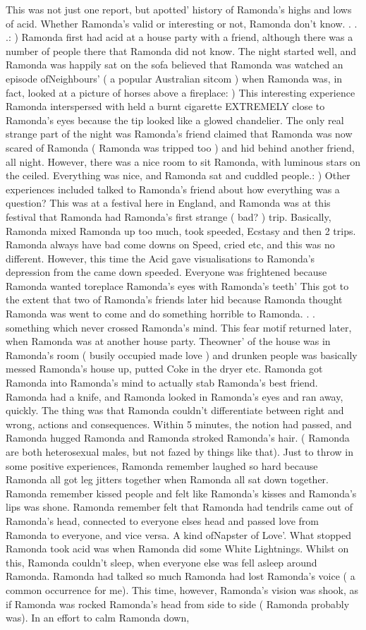 \documentclass[12pt]{book}
\begin{document}
This was not just one report, but apotted' history of Ramonda's highs and lows of acid. Whether Ramonda's valid or interesting or not, Ramonda don't know. . . .: ) Ramonda first had acid at a house party with a friend, although there was a number of people there that Ramonda did not know. The night started well, and Ramonda was happily sat on the sofa believed that Ramonda was watched an episode ofNeighbours' ( a popular Australian sitcom ) when Ramonda was, in fact, looked at a picture of horses above a fireplace: ) This interesting experience Ramonda interspersed with held a burnt cigarette EXTREMELY close to Ramonda's eyes because the tip looked like a glowed chandelier. The only real strange part of the night was Ramonda's friend claimed that Ramonda was now scared of Ramonda ( Ramonda was tripped too ) and hid behind another friend, all night. However, there was a nice room to sit Ramonda, with luminous stars on the ceiled. Everything was nice, and Ramonda sat and cuddled people.: ) Other experiences included talked to Ramonda's friend about how everything was a question? This was at a festival here in England, and Ramonda was at this festival that Ramonda had Ramonda's first strange ( bad? ) trip. Basically, Ramonda mixed Ramonda up too much, took speeded, Ecstasy and then 2 trips. Ramonda always have bad come downs on Speed, cried etc, and this was no different. However, this time the Acid gave visualisations to Ramonda's depression from the came down speeded. Everyone was frightened because Ramonda wanted toreplace Ramonda's eyes with Ramonda's teeth' This got to the extent that two of Ramonda's friends later hid because Ramonda thought Ramonda was went to come and do something horrible to Ramonda. . . something which never crossed Ramonda's mind. This fear motif returned later, when Ramonda was at another house party. Theowner' of the house was in Ramonda's room ( busily occupied made love ) and drunken people was basically messed Ramonda's house up, putted Coke in the dryer etc. Ramonda got Ramonda into Ramonda's mind to actually stab Ramonda's best friend. Ramonda had a knife, and Ramonda looked in Ramonda's eyes and ran away, quickly. The thing was that Ramonda couldn't differentiate between right and wrong, actions and consequences. Within 5 minutes, the notion had passed, and Ramonda hugged Ramonda and Ramonda stroked Ramonda's hair. ( Ramonda are both heterosexual males, but not fazed by things like that). Just to throw in some positive experiences, Ramonda remember laughed so hard because Ramonda all got leg jitters together when Ramonda all sat down together. Ramonda remember kissed people and felt like Ramonda's kisses and Ramonda's lips was shone. Ramonda remember felt that Ramonda had tendrils came out of Ramonda's head, connected to everyone elses head and passed love from Ramonda to everyone, and vice versa. A kind ofNapster of Love'. What stopped Ramonda took acid was when Ramonda did some White Lightnings. Whilst on this, Ramonda couldn't sleep, when everyone else was fell asleep around Ramonda. Ramonda had talked so much Ramonda had lost Ramonda's voice ( a common occurrence for me). This time, however, Ramonda's vision was shook, as if Ramonda was rocked Ramonda's head from side to side ( Ramonda probably was). In an effort to calm Ramonda down, 
\end{document}
